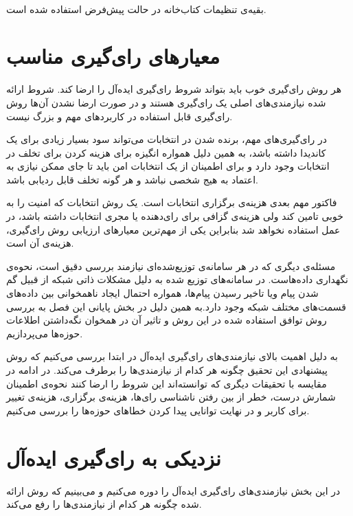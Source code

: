 \\
بقیه‌ی تنظیمات کتاب‌خانه در حالت پیش‌فرض استفاده شده است.
\section{معیار‌های رای‌گیری مناسب}
هر روش رای‌گیری خوب باید بتواند شروط رای‌گیری ایده‌آل را ارضا کند. شروط ارائه شده نیازمندی‌های اصلی یک رای‌گیری هستند و در صورت ارضا نشدن آن‌ها روش رای‌گیری قابل استفاده در کاربرد‌های مهم و بزرگ نیست. 
\par 
در رای‌گیری‌های مهم، برنده شدن در انتخابات می‌تواند سود بسیار زیادی برای یک کاندیدا داشته باشد، به همین دلیل همواره انگیزه برای هزینه کردن برای تخلف در انتخابات وجود دارد و برای اطمینان از یک انتخابات امن باید تا جای ممکن نیازی به اعتماد به هیج شخصی نباشد و هر گونه تخلف قابل ردیابی باشد. 
\par 
فاکتور مهم بعدی هزینه‌ی برگزاری انتخابات است. یک روش انتخابات که امنیت را به خوبی تامین کند ولی هزینه‌ی گزافی برای رای‌دهنده یا مجری انتخابات داشته باشد، در عمل استفاده نخواهد شد بنابراین یکی از مهم‌ترین معیارهای ارزیابی روش رای‌گیری، هزینه‌ی آن است. 
\par 
مسئله‌ی دیگری که در هر سامانه‌ی توزیع‌شده‌ای نیازمند بررسی دقیق است، نحوه‌ی نگهداری داده‌هاست. در سامانه‌های توزیع شده به دلیل مشکلات ذاتی شبکه از قبیل گم شدن پیام ویا تاخیر رسیدن پیام‌ها، همواره احتمال ایجاد ناهمخوانی بین داده‌های قسمت‌های مختلف شبکه وجود دارد.به همین دلیل در بخش پایانی این فصل به بررسی روش توافق استفاده شده در این روش و تاثیر آن در همخوان نگه‌داشتن اطلاعات حوزه‌ها می‌پردازیم. 
\par
به دلیل اهمیت بالای نیازمندی‌های رای‌گیری ایده‌آل در ابتدا بررسی می‌کنیم که روش پیشنهادی این تحقیق چگونه هر کدام از نیازمندی‌ها را برطرف می‌کند. در ادامه در مقایسه با تحقیقات دیگری که توانسته‌اند این شروط را ارضا کنند نحوه‌ی اطمینان شمارش درست، خطر از بین رفتن ناشناسی رای‌ها، هزینه‌ی برگزاری، هزینه‌ی تغییر برای کاربر و در نهایت توانایی پیدا کردن خطاهای حوزه‌ها را بررسی می‌کنیم.
\section{نزدیکی به رای‌گیری ایده‌آل}
در این بخش نیازمندی‌های رای‌گیری ایده‌آل را دوره می‌کنیم و می‌بینیم که روش ارائه شده چگونه هر کدام از نیاز‌مندی‌ها را رفع می‌کند.

